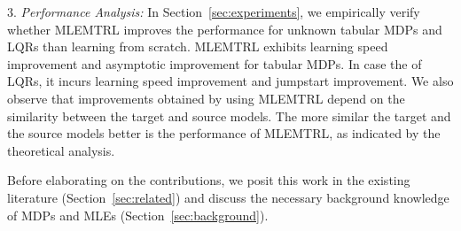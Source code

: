 3. \textit{Performance Analysis:} In Section~\ref{sec:experiments}, we empirically verify whether MLEMTRL improves the performance for unknown tabular MDPs and LQRs than learning from scratch. MLEMTRL exhibits learning speed improvement and asymptotic improvement for tabular MDPs. In case the of LQRs, it incurs learning speed improvement and jumpstart improvement. We also observe that improvements obtained by using MLEMTRL depend on the similarity between the target and source models. The more similar the target and the source models better is the performance of MLEMTRL, as indicated by the theoretical analysis.



Before elaborating on the contributions, we posit this work in the existing literature (Section~\ref{sec:related}) and discuss the necessary background knowledge of MDPs and MLEs (Section~\ref{sec:background}).

